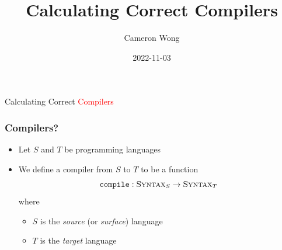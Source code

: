 \documentclass[usenames,dvipsnames]{beamer}
\title[]{Calculating Correct Compilers} %
\author{Cameron Wong} %
\institute[CS-252R]{Bahr/Hutton 2015, Pickard/Hutton 2021}
\date{2022-11-03} %
\newcommand{\compile}{\texttt{compile}}
\newcommand{\syn}{\textsc{Syntax}}
\begin{document}
\begin{frame}
\titlepage %
\end{frame}




\begin{frame}
  \frametitle{}

  \begin{center}
    \Huge Calculating Correct \textcolor{red}{Compilers}
  \end{center}
\end{frame}


\begin{frame}
  \frametitle{Compilers?}

  \begin{itemize}
    \item Let $S$ and $T$ be programming languages
    \item We define a compiler from $S$ to $T$ to be a function
      \begin{equation}
        \compile : \syn_{S} \rightarrow \syn_{T}
      \end{equation}
      where
      \begin{itemize}
        \item $S$ is the \emph{source} (or \emph{surface}) language
        \item $T$ is the \emph{target} language
      \end{itemize}
  \end{itemize}
\end{frame}
\end{document}
